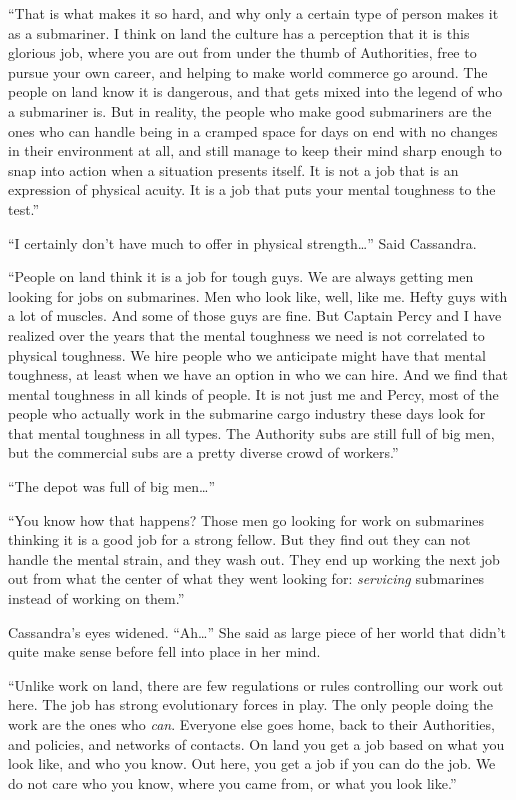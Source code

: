 \documentclass[]{scrbook}
\begin{document}
``That is what makes it so hard, and why only a certain type of person
makes it as a submariner. I think on land the culture has a perception
that it is this glorious job, where you are out from under the thumb of
Authorities, free to pursue your own career, and helping to make world
commerce go around. The people on land know it is dangerous, and that
gets mixed into the legend of who a submariner is. But in reality, the
people who make good submariners are the ones who can handle being in a
cramped space for days on end with no changes in their environment at
all, and still manage to keep their mind sharp enough to snap into
action when a situation presents itself. It is not a job that is an
expression of physical acuity. It is a job that puts your mental
toughness to the test.''

``I certainly don't have much to offer in physical strength\ldots{}''
Said Cassandra.

``People on land think it is a job for tough guys. We are always getting
men looking for jobs on submarines. Men who look like, well, like me.
Hefty guys with a lot of muscles. And some of those guys are fine. But
Captain Percy and I have realized over the years that the mental
toughness we need is not correlated to physical toughness. We hire
people who we anticipate might have that mental toughness, at least when
we have an option in who we can hire. And we find that mental toughness
in all kinds of people. It is not just me and Percy, most of the people
who actually work in the submarine cargo industry these days look for
that mental toughness in all types. The Authority subs are still full of
big men, but the commercial subs are a pretty diverse crowd of
workers.''

``The depot was full of big men\ldots{}''

``You know how that happens? Those men go looking for work on submarines
thinking it is a good job for a strong fellow. But they find out they
can not handle the mental strain, and they wash out. They end up working
the next job out from what the center of what they went looking for:
\emph{servicing} submarines instead of working on them.''

Cassandra's eyes widened. ``Ah\ldots{}'' She said as large piece of her
world that didn't quite make sense before fell into place in her mind.

``Unlike work on land, there are few regulations or rules controlling
our work out here. The job has strong evolutionary forces in play. The
only people doing the work are the ones who \emph{can}. Everyone else
goes home, back to their Authorities, and policies, and networks of
contacts. On land you get a job based on what you look like, and who you
know. Out here, you get a job if you can do the job. We do not care who
you know, where you came from, or what you look like.''
\end{document}
